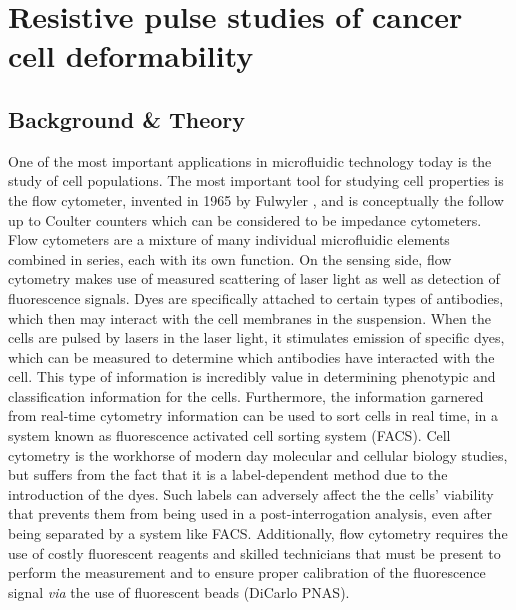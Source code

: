 \graphicspath{{../images/ch5/}}	%


\chapter{Resistive pulse studies of cancer cell deformability}
\label{chap:cell}

	

	\section{Background \& Theory}
	      
		One of the most important applications in microfluidic technology today is the study of cell populations. The most important tool for studying cell properties is the flow cytometer, invented in 1965 by Fulwyler \cite{Fulwyler1965}, and is conceptually the follow up to Coulter counters which can be considered to be impedance cytometers. Flow cytometers are a mixture of many individual microfluidic elements combined in series, each with its own function. On the sensing side, flow cytometry makes use of measured scattering of laser light as well as detection of fluorescence signals. Dyes are specifically attached to certain types of antibodies, which then may interact with the cell membranes in the suspension. When the cells are pulsed by lasers in the laser light, it stimulates emission of specific dyes, which can be measured to determine which antibodies have interacted with the cell. This type of information is incredibly value in determining phenotypic and classification information for the cells. Furthermore, the information garnered from real-time cytometry information can be used to sort cells in real time, in a system known as fluorescence activated cell sorting system (FACS). Cell cytometry is the workhorse of modern day molecular and cellular biology studies, but suffers from the fact that it is a label-dependent method due to the introduction of the dyes. Such labels can adversely affect the the cells' viability that prevents them from being used in a post-interrogation analysis, even after being separated by a system like FACS. Additionally, flow cytometry requires the use of costly fluorescent reagents and skilled technicians that must be present to perform the measurement and to ensure proper calibration of the fluorescence signal \textit{via} the use of fluorescent beads \cite{Gosset2012} (DiCarlo PNAS).
	
